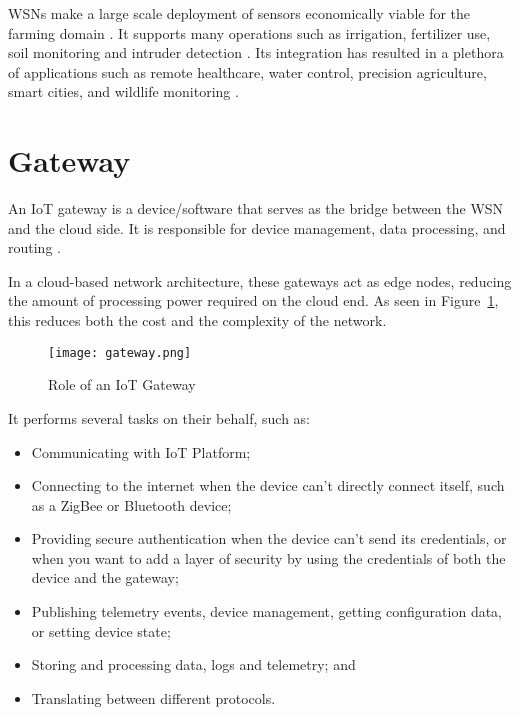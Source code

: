 WSNs make a large scale deployment of sensors economically viable for the farming domain \cite{pfWSN}. It supports many operations such as irrigation, fertilizer use, soil monitoring and intruder detection \cite{main3}. Its integration has resulted in a plethora of applications such as remote healthcare, water control, precision agriculture, smart cities, and wildlife monitoring \cite{main2}.

\section{Gateway}
An IoT gateway is a device/software that serves as the bridge between the WSN and the cloud side. It is responsible for device management, data processing, and routing \cite{usingGateways}.

\noindent
In a cloud-based network architecture, these gateways act as edge nodes, reducing the amount of processing power required on the cloud end. As seen in Figure~\ref{fig:gateway}, this reduces both the cost and the complexity of the network. 

\begin{figure}[h]
  \centering
  \texttt{[image: gateway.png]}
  \caption{Role of an IoT Gateway \cite{whatGateway}}
  \label{fig:gateway}
\end{figure}

\noindent
It performs several tasks on their behalf, such as: \cite{usingGateways}
\begin{itemize}
  \item Communicating with IoT Platform;
  \item Connecting to the internet when the device can't directly connect itself, such as a ZigBee or Bluetooth device;
  \item Providing secure authentication when the device can't send its credentials, or when you want to add a layer of security by using the credentials of both the device and the gateway;
  \item Publishing telemetry events, device management, getting configuration data, or setting device state;
  \item Storing and processing data, logs and telemetry; and
  \item Translating between different protocols.
\end{itemize}

